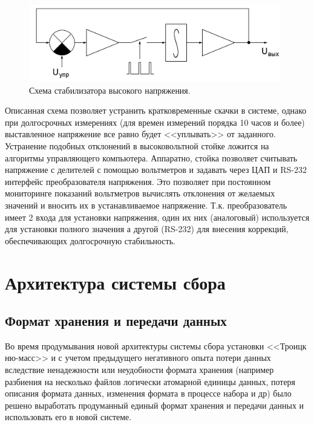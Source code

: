 \documentclass[a4paper,14pt]{extreport}
\begin{document}
\begin{figure}
  \centering
  \includegraphics[width = 0.98\textwidth]{img/nu_mass_setup/hv_stabilizer_scheme.png}
    \caption{Схема стабилизатора высокого напряжения.}
    \label{fig:numass-hv-stabilizer-scheme}
\end{figure}

Описанная схема позволяет устранить кратковременные скачки в системе, однако при долгосрочных измерениях (для времен измерений порядка 10 часов и более) выставленное напряжение все равно будет <<уплывать>> от заданного. Устранение подобных отклонений в высоковольтной стойке ложится на алгоритмы управляющего компьютера. Аппаратно, стойка позволяет считывать напряжение с делителей с помощью вольтметров и задавать через ЦАП и  RS-232 интерфейс преобразователя напряжения. Это позволяет при постоянном мониторинге показаний вольтметров вычислять отклонения от желаемых значений и вносить их в устанавливаемое напряжение. Т.к. преобразователь имеет 2 входа для установки напряжения, один их них (аналоговый) используется для установки полного значения а другой (RS-232) для внесения коррекций, обеспечивающих долгосрочную стабильность.


\chapter{Архитектура системы сбора}

\section{Формат хранения и передачи данных}

Во время продумывания новой архитектуры системы сбора установки <<Троицк ню-масс>> и с учетом предыдущего негативного опыта потери данных вследствие ненадежности или неудобности формата хранения (например разбиения на несколько файлов логически атомарной единицы данных, потеря описания формата данных, изменения формата в процессе набора и др) было решено выработать продуманный единый формат хранения и передачи данных и использовать его в новой системе.
\end{document}
